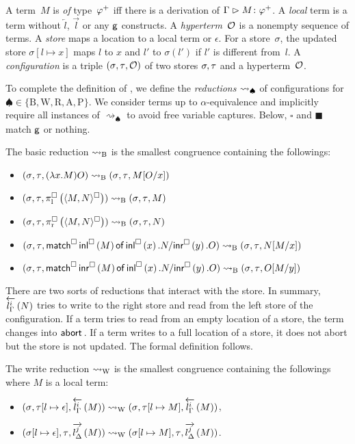 A term~$M$ is \textit{of} type~$\m\varphi$ iff there is a derivation of
$\Gamma\tr
\tj{M}{\m\varphi}$.
A \textit{local} term is a term without $\overleftarrow l$,
$\overrightarrow l$ or any $\g$ constructs.
A \textit{hyperterm}~$\hypert$ is a nonempty sequence of terms.
A \textit{store} maps a location to a
local term or $\epsilon$.
For a store~$\sigma$, the updated store $\sigma[l\mapsto x]$ maps $l$ to
$x$ and $l'$ to $\sigma(l')$ if $l'$ is different from~$l$.
A \textit{configuration} is a triple $\conf{}{}\hypert$ of two
stores $\lstore, \rstore$ and a hyperterm~$\hypert$.

To complete the definition of \lgd,
 we define the \textit{reductions} $\reduce_\spadesuit$ of
 configurations for $\spadesuit\in\{\mathrm B, \mathrm W, \mathrm R, \mathrm A,
 \mathrm P\}$.
 We consider terms up to $\alpha$-equivalence and implicitly
 require all instances
 of $\rightsquigarrow_\spadesuit$ to avoid free variable captures.
 Below, $\square$ and $\blacksquare$ match $\g$ or nothing.

\begin{definition}
 The basic reduction $\breduce$ is the smallest congruence containing
 the followings:
 \begin{itemize}
  \item  $\conf{}{}{(\lambda x.M)O}\breduce
 \conf{}{}{M[O/x]}$
  \item $\conf{}{}{\spil{\spair{M,N}}} \breduce
	 \conf{}{}{           M   }$
  \item $\conf{}{}{\spir{\spair{M,N}}} \breduce
	 \conf{}{}{             N }$
  \item $\conf{}{}{\smat{\sinl M}x N y O} \breduce
	 \conf{}{}{              N[M/x]}$
  \item $\conf{}{}{\smat{\sinr M}x N y O} \breduce
	 \conf{}{}{                  O[M/y]}$
 \end{itemize}
\end{definition}

There are two sorts of reductions that interact with the store.
In summary, $\rtol i l \Gamma N$ tries to write to the right store and read from
the left store of the configuration.
If a term tries to read from an empty location of a store,
the term changes into $\abort$.  If a term writes to a full location of
a store, it does not abort but the store is not updated.
The formal definition follows.
\begin{definition}
 The write reduction $\wreduce$ is the smallest congruence
 containing the followings where $M$ is a local term:
 \begin{itemize}
  \item $\conf{}{[l\mapsto\epsilon]}{\rtol i l \Gamma M}
	\wreduce
	\conf{}{[l\mapsto M]}{\rtol i l \Gamma M}
	$\enspace,
  \item $\conf{[l\mapsto\epsilon]}{}{\ltor j l \Delta M}
	\wreduce
	\conf{[l\mapsto M]}{}{\ltor j l \Delta M}
	$\enspace.
 \end{itemize}
\end{definition}

